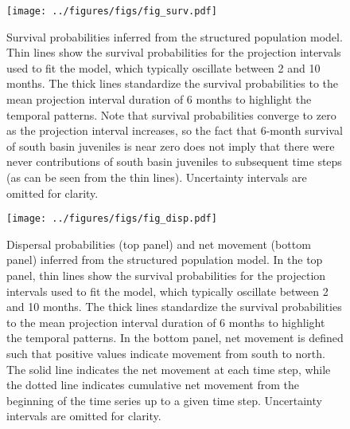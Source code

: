 \documentclass[11pt]{article}
\begin{document}
\clearpage
\begin{figure}
\centering
\texttt{[image: ../figures/figs/fig\_surv.pdf]}
\caption{\label{fig:surv}
Survival probabilities inferred from the structured population model.
Thin lines show the survival probabilities for the projection intervals
used to fit the model, 
which typically oscillate between 2 and 10 months.
The thick lines standardize the survival probabilities to the mean 
projection interval duration of 6 months to highlight the temporal patterns.
Note that survival probabilities converge to zero as the projection interval increases,
so the fact that 6-month survival of south basin juveniles is near zero does not 
imply that there were never contributions of south basin juveniles to subsequent time steps
(as can be seen from the thin lines).
Uncertainty intervals are omitted for clarity.
}
\end{figure}
\clearpage

\clearpage
\begin{figure}
\centering
\texttt{[image: ../figures/figs/fig\_disp.pdf]}
\caption{\label{fig:disp}
Dispersal probabilities (top panel) and net movement (bottom panel)
inferred from the structured population model.
In the top panel,
thin lines show the survival probabilities for the projection intervals
used to fit the model, 
which typically oscillate between 2 and 10 months.
The thick lines standardize the survival probabilities to the mean 
projection interval duration of 6 months to highlight the temporal patterns.
In the bottom panel,
net movement is defined such that positive values indicate movement from
south to north.
The solid line indicates the net movement at each time step,
while the dotted line indicates cumulative net movement from the 
beginning of the time series up to a given time step.
Uncertainty intervals are omitted for clarity.
}
\end{figure}
\clearpage
\end{document}

